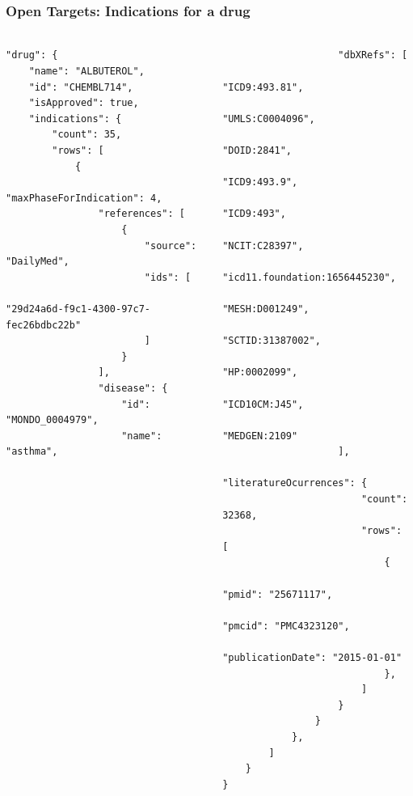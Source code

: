 \documentclass[aspectratio=169,xcolor=dvipsnames]{beamer}
\begin{document}
\begin{frame}[fragile,t]
  \frametitle{Open Targets: Indications for a drug}
  \framesubtitle{}
  \tiny
  \begin{columns}[t]
    \begin{column}{0.5\textwidth}
      \vspace{-2\baselineskip}
\begin{verbatim}
"drug": {
    "name": "ALBUTEROL",
    "id": "CHEMBL714",
    "isApproved": true,
    "indications": {
        "count": 35,
        "rows": [
            {
                "maxPhaseForIndication": 4,
                "references": [
                    {
                        "source": "DailyMed",
                        "ids": [
                            "29d24a6d-f9c1-4300-97c7-fec26bdbc22b"
                        ]
                    }
                ],
                "disease": {
                    "id": "MONDO_0004979",
                    "name": "asthma",
\end{verbatim}
    \end{column}
    \begin{column}{0.5\textwidth}
      \vspace{-2\baselineskip}
\begin{verbatim}
                    "dbXRefs": [
                        "ICD9:493.81",
                        "UMLS:C0004096",
                        "DOID:2841",
                        "ICD9:493.9",
                        "ICD9:493",
                        "NCIT:C28397",
                        "icd11.foundation:1656445230",
                        "MESH:D001249",
                        "SCTID:31387002",
                        "HP:0002099",
                        "ICD10CM:J45",
                        "MEDGEN:2109"
                    ],
                    "literatureOcurrences": {
                        "count": 32368,
                        "rows": [
                            {
                                "pmid": "25671117",
                                "pmcid": "PMC4323120",
                                "publicationDate": "2015-01-01"
                            },
                        ]
                    }
                }
            },
        ]
    }
}
\end{verbatim}
    \end{column}
  \end{columns}
\end{frame}
\end{document}
